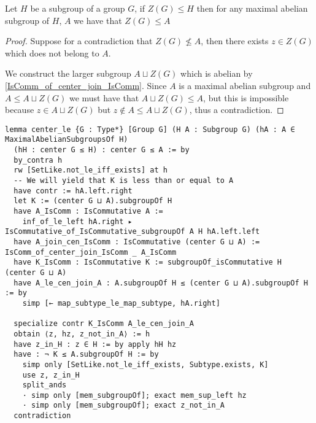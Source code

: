 \begin{lemma}
  \label{MaximalAbelianSubgroup.center_le}
  Let $H$ be a subgroup of a group $G$, if $Z(G) \le H$ then for any maximal abelian subgroup of $H$, $A$ we have that $Z(G) \le A$ 
  \leanok
\end{lemma}
\begin{proof}
  \leanok

  Suppose for a contradiction that $Z(G) \not\le A$, then there exists $z \in Z(G)$ which does not belong to $A$.

  We construct the larger subgroup $A \sqcup Z(G)$ which is abelian by \ref{IsComm_of_center_join_IsComm}. Since 
  $A$ is a maximal abelian subgroup and $A \le A \sqcup Z(G)$ we must have that $A \sqcup Z(G) \le A$, but this is impossible 
  because $z \in A \sqcup Z(G)$ but $z \notin A \le A \sqcup Z(G)$, thus a contradiction.
\end{proof}
\begin{footnotesize}
\begin{verbatim}
lemma center_le {G : Type*} [Group G] (H A : Subgroup G) (hA : A ∈ MaximalAbelianSubgroupsOf H)
  (hH : center G ≤ H) : center G ≤ A := by
  by_contra h
  rw [SetLike.not_le_iff_exists] at h
  -- We will yield that K is less than or equal to A
  have contr := hA.left.right
  let K := (center G ⊔ A).subgroupOf H
  have A_IsComm : IsCommutative A :=
    inf_of_le_left hA.right ▸ IsCommutative_of_IsCommutative_subgroupOf A H hA.left.left
  have A_join_cen_IsComm : IsCommutative (center G ⊔ A) := IsComm_of_center_join_IsComm _ A_IsComm
  have K_IsComm : IsCommutative K := subgroupOf_isCommutative H (center G ⊔ A)
  have A_le_cen_join_A : A.subgroupOf H ≤ (center G ⊔ A).subgroupOf H := by
    simp [← map_subtype_le_map_subtype, hA.right]

  specialize contr K_IsComm A_le_cen_join_A
  obtain ⟨z, hz, z_not_in_A⟩ := h
  have z_in_H : z ∈ H := by apply hH hz
  have : ¬ K ≤ A.subgroupOf H := by
    simp only [SetLike.not_le_iff_exists, Subtype.exists, K]
    use z, z_in_H
    split_ands
    · simp only [mem_subgroupOf]; exact mem_sup_left hz
    · simp only [mem_subgroupOf]; exact z_not_in_A
  contradiction
\end{verbatim}
\end{footnotesize}

